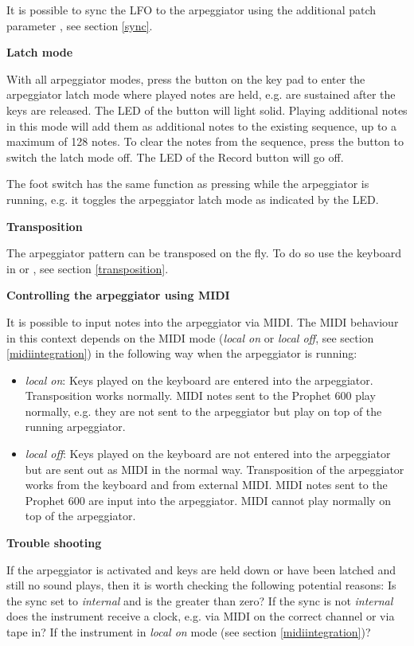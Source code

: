 It is possible to sync the LFO to the arpeggiator using the additional patch parameter \clocksync, see section \ref{sync}.

\textbf{Latch mode}

With all arpeggiator modes, press the \record button on the key pad to enter the arpeggiator latch mode where played notes are held, e.g. are sustained after the keys are released. The LED of the \record button will light solid. Playing additional notes in this mode will add them as additional notes to the existing sequence, up to a maximum of 128 notes. To clear the notes from the sequence, press the \record button to switch the latch mode off. The LED of the Record button will go off.

The foot switch has the same function as pressing \record while the arpeggiator is running, e.g. it toggles the arpeggiator latch mode as indicated by the \record LED. 

\textbf{Transposition}

The arpeggiator pattern can be transposed on the fly. To do so use the keyboard in \shiftmode or \shiftlock, see section \ref{transposition}.

\textbf{Controlling the arpeggiator using MIDI}

It is possible to input notes into the arpeggiator via MIDI. The MIDI behaviour in this context depends on the MIDI mode (\textit{local on} or \textit{local off}, see section \ref{midiintegration}) in the following way when the arpeggiator is running:

\begin{itemize}
  \item \textit{local on}: Keys played on the keyboard are entered into the arpeggiator. Transposition works normally. MIDI notes sent to the Prophet 600 play normally, e.g. they are not sent to the arpeggiator but play  on top of the running arpeggiator.
  \item \textit{local off}: Keys played on the keyboard are not entered into the arpeggiator but are sent out as MIDI in the normal way. Transposition of the arpeggiator works from the keyboard and from external MIDI. MIDI notes sent to the Prophet 600 are input into the arpeggiator. MIDI cannot play normally on top of the arpeggiator. 
\end{itemize}

\textbf{Trouble shooting}

If the arpeggiator is activated and keys are held down or have been latched and still no sound plays, then it is worth checking the following potential reasons: Is the sync set to \textit{internal} and is the \clock greater than zero? If the sync is not \textit{internal} does the instrument receive a clock, e.g. via MIDI on the correct channel or via tape in? If the instrument in \textit{local on} mode (see section \ref{midiintegration})?
